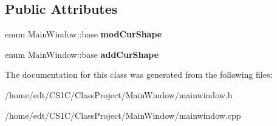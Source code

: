 \subsection*{Public Attributes}
\begin{DoxyCompactItemize}
\item 
\hypertarget{classMainWindow_aae71fe8e7810224f27c78b6417f46606}{enum Main\-Window\-::base {\bfseries mod\-Cur\-Shape}}\label{classMainWindow_aae71fe8e7810224f27c78b6417f46606}

\item 
\hypertarget{classMainWindow_afb1baef08726f6699edc677c29418560}{enum Main\-Window\-::base {\bfseries add\-Cur\-Shape}}\label{classMainWindow_afb1baef08726f6699edc677c29418560}

\end{DoxyCompactItemize}


The documentation for this class was generated from the following files\-:\begin{DoxyCompactItemize}
\item 
/home/edt/\-C\-S1\-C/\-Class\-Project/\-Main\-Window/mainwindow.\-h\item 
/home/edt/\-C\-S1\-C/\-Class\-Project/\-Main\-Window/mainwindow.\-cpp\end{DoxyCompactItemize}
